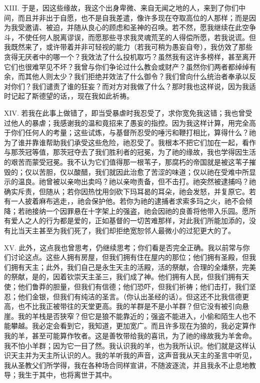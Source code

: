 XIII. 于是，因这些缘故，我这个出身卑微、来自无闻之地的人，来到了你们中间，而且并非出于自愿，也不是自我差遣，像许多现在夺取高位的人那样；而是因为我受邀请、被迫，并随从良心的顾虑和圣神的召唤。若不然，愿我继续在此空争斗，不使任何人脱离谬误，而愿那些寻求我灵魂荒芜的人得偿所愿，若我说谎。但我既然来了，或许带着并非可轻视的能力（若我可稍为愚妄自夸），我仿效了那些贪得无厌者中的哪一个？我效法了什么投机取巧？虽然我有这许多榜样，甚至离开它们也很难罕见不坏？我曾与你们争论过什么教会或财产？虽然你们两者都绰绰有余，而其他人则太少？我们拒绝并效法了什么御令？我们曾向什么统治者奉承以反对你们？我们谴责了谁的狂妄？而对方对我做了什么？那时我也这样说，因为我适时记起了斯德望的话，，现在我如此祈祷。\par

XIV. 若我在此事上做错了，即当受暴虐时我忍受了，求你宽免我这错；我也曾受过他人的暴虐；我感谢我的温和竟招来了愚妄的指控。因为我这样计算，用完全高于你们任何人的考量；这些试炼，与基督所忍受的唾污和鞭打相比，算得什么？祂为了谁并靠谁帮助我们承受这些危险，祂忍受了。我根本不把它们加在一起，看作与那茨冠等值，那茨冠夺去了我们胜利者的冠冕，为了祂的缘故，我也学得因生活的艰苦而蒙受冠冕。我不认为它们值得那一根苇子，那腐朽的帝国就是被这苇子摧毁的；仅以苦胆，仅以酸醋，我们就因此治愈了苦涩的味道；仅以祂在受难中所显示的温良。祂曾被以亲吻出卖吗？祂以亲吻责备，但不击打。祂突然被逮捕吗？祂确实斥责，但随从；若你因热忱用剑砍下玛耳曷的耳朵，祂会发怒，并复原它。若有一人披着麻布逃走，，祂会保护他。若你为祂的逮捕者求索多玛之火，祂不会倾降；若祂接纳一个因罪悬在十字架上的强盗，祂会因祂的良善将他带入乐园。愿所有爱人之人的行为都是爱的，正如基督的一切苦难那样，对此我们所能加添的，没有比当天主甚至为我们死了，我们却拒绝宽恕邻人最微小的过犯更大的了。\par

XV. 此外，这点我也曾思考，仍继续思考；你们看是否完全正确。我以前常与你们讨论这点。这些人拥有房屋，但我们拥有住在屋内的那位；他们拥有圣殿，但我们拥有天主；此外，我们自己是永生天主的活殿，活的祭献，合理的全燔祭，完美的祭献，是的，因着钦崇天主圣三，我们成了神。他们拥有人民，但我们拥有天使；他们鲁莽的胆量，但我们有信德；他们恐吓，但我们祈祷；他们击打，我们坚忍；他们金银，但我们有纯洁的圣言。（你认出圣经的话）。但这还不比我信德更高，也不比我正被带往的天堂更高。我的羊群是不是小羊群？但它没有被引向悬崖。我的羊栈是否狭窄？但它是狼不能靠近的；强盗不能进入，小偷和陌生人也不能攀越。我必定会看到它，我知道，更加宽广。而且许多现在为狼的，我必定算作我的羊，甚至可能算作牧者。这是善牧带给我的喜讯，为了祂的缘故我为羊舍命。我不怕小羊群；因为它一目了然。我认识我的羊，也为我所认识。他们就是这样认识天主并为天主所认识的人。我的羊听我的声音，这声音我从天主的圣言中听见，我从圣教父们所学得，我在各种场合同样宣讲，不随波逐流，并且我永不止息地教导；我生于其中，也将离世于其中。\par

